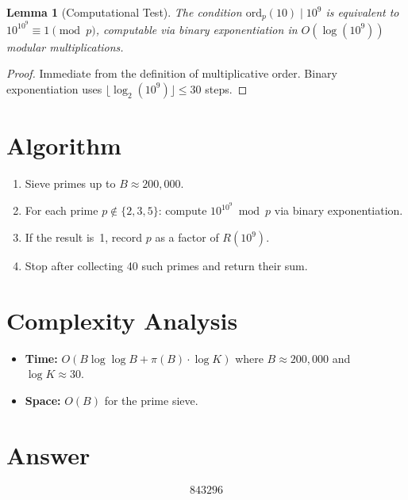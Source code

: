\documentclass[12pt]{article}
\newtheorem{lemma}[theorem]{Lemma}
\begin{document}
\begin{lemma}[Computational Test]
The condition $\mathrm{ord}_p(10) \mid 10^9$ is equivalent to $10^{10^9} \equiv 1 \pmod{p}$, computable via binary exponentiation in $O(\log(10^9))$ modular multiplications.
\end{lemma}

\begin{proof}
Immediate from the definition of multiplicative order. Binary exponentiation uses $\lfloor \log_2(10^9) \rfloor \leq 30$ steps.
\end{proof}

\section{Algorithm}
\begin{enumerate}
    \item Sieve primes up to $B \approx 200{,}000$.
    \item For each prime $p \notin \{2, 3, 5\}$: compute $10^{10^9} \bmod p$ via binary exponentiation.
    \item If the result is~1, record $p$ as a factor of $R(10^9)$.
    \item Stop after collecting 40 such primes and return their sum.
\end{enumerate}

\section{Complexity Analysis}
\begin{itemize}
    \item \textbf{Time:} $O(B \log\log B + \pi(B) \cdot \log K)$ where $B \approx 200{,}000$ and $\log K \approx 30$.
    \item \textbf{Space:} $O(B)$ for the prime sieve.
\end{itemize}

\section{Answer}

\[
\boxed{843296}
\]
\end{document}
